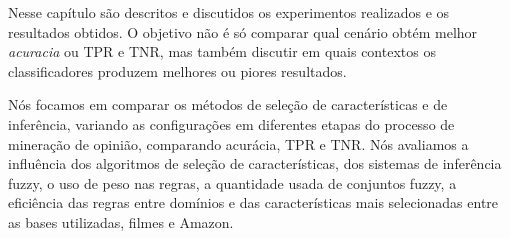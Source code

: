 \documentclass[template.tex]{subfiles}
\begin{document}

Nesse capítulo são descritos e discutidos os experimentos realizados e os resultados obtidos. O objetivo não é só comparar qual cenário obtém melhor \textit{acuracia} ou TPR e TNR, mas também discutir em quais contextos os classificadores produzem melhores ou piores resultados.


Nós focamos em comparar os métodos de seleção de características e de inferência, variando as configurações em diferentes etapas do processo de mineração de opinião, comparando acurácia, TPR e TNR. Nós avaliamos a influência dos algoritmos de seleção de características, dos sistemas de inferência fuzzy, o uso de peso nas regras, a quantidade usada de conjuntos fuzzy, a eficiência das regras entre domínios e das características mais selecionadas entre as bases utilizadas, filmes e Amazon. 




\end{document}
